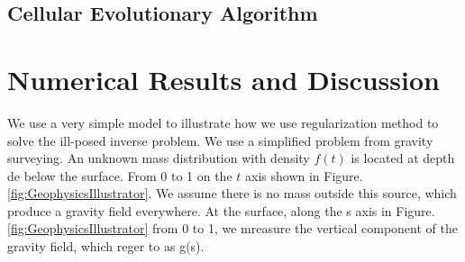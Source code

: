 \documentclass{article}
\begin{document}
\subsection{Cellular Evolutionary Algorithm}
\section{Numerical Results and Discussion}
We use a very simple model to illustrate how we use regularization method to
solve the ill-posed inverse problem. We use a simplified problem from gravity
surveying. An unknown mass distribution with density \(f(t)\) is located at
depth de below the surface. From 0 to 1 on the \(t\) axis shown in
Figure. \ref{fig:GeophysicsIllustrator}. We assume there is no mass outside
this source, which produce a gravity field everywhere. At the surface, along the
s axis in Figure. \ref{fig:GeophysicsIllustrator} from 0 to 1, we mreasure the
vertical component of the gravity field, which reger to as g(s).
 
\end{document}

